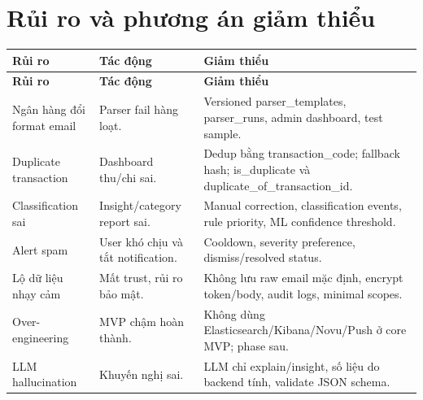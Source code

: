 \documentclass[11pt,a4paper]{article}
\renewcommand{\thead}[1]{\textbf{\color{PrimaryDark}#1}}
\newenvironment{tableblock}{\Needspace{8\baselineskip}\vspace{0.25em}}{\vspace{0.75em}}
\begin{document}
\section{Rủi ro và phương án giảm thiểu}
\begin{tableblock}
\scriptsize
\begin{longtable}{L{4.1cm}L{5.0cm}L{6.1cm}}
\thead{Rủi ro} & \thead{Tác động} & \thead{Giảm thiểu} \\
\endfirsthead
{}\thead{Rủi ro} & \thead{Tác động} & \thead{Giảm thiểu} \\
\endhead
Ngân hàng đổi format email & Parser fail hàng loạt. & Versioned parser\_templates, parser\_runs, admin dashboard, test sample. \\
Duplicate transaction & Dashboard thu/chi sai. & Dedup bằng transaction\_code; fallback hash; is\_duplicate và duplicate\_of\_transaction\_id. \\
Classification sai & Insight/category report sai. & Manual correction, classification events, rule priority, ML confidence threshold. \\
Alert spam & User khó chịu và tắt notification. & Cooldown, severity preference, dismiss/resolved status. \\
Lộ dữ liệu nhạy cảm & Mất trust, rủi ro bảo mật. & Không lưu raw email mặc định, encrypt token/body, audit logs, minimal scopes. \\
Over-engineering & MVP chậm hoàn thành. & Không dùng Elasticsearch/Kibana/Novu/Push ở core MVP; phase sau. \\
LLM hallucination & Khuyến nghị sai. & LLM chỉ explain/insight, số liệu do backend tính, validate JSON schema. \\
\end{longtable}
\end{tableblock}
\end{document}
